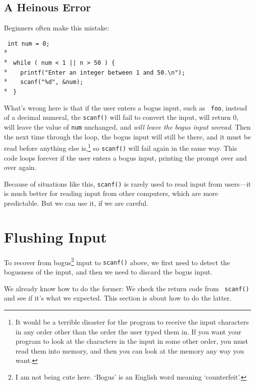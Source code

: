 \subsection{A Heinous Error}

Beginners often make this mistake:
\label{heinous-error}

\begin{flushleft}
\verb! int num = 0; ! \\*
\verb!  ! \\*
\verb! while ( num < 1 || n > 50 ) { ! \\*
\verb!   printf("Enter an integer between 1 and 50.\n"); ! \\*
\verb!   scanf("%d", &num); ! \\*
\verb! } ! 
\end{flushleft}

What's wrong here is that if the user enters a bogus input, such as {\tt
foo}, instead of a decimal numeral, the {\tt scanf()} will fail to
convert the input, will return 0, will leave the value of {\tt num}
unchanged, and {\em will leave the bogus input unread}\/.  Then the next
time through the loop, the bogus input will still be there, and it must
be read before anything else is,\footnote{It would be a terrible
disaster for the program to receive the input characters in any order
other than the order the user typed them in.  If you want your program
to look at the characters in the input in some other order, you must
read them into memory, and then you can look at the memory any way you
want.} so {\tt scanf()} will fail again in the same way.  This code
loops forever if the user enters a bogus input, printing the prompt over
and over again.

Because of situations like this, {\tt scanf()} is rarely used to read
input from users---it is much better for reading input from other
computers, which are more predictable.  But we can use it, if we are
careful.

\section{Flushing Input}

To recover from bogus\footnote{I am not being cute here.  `Bogus' is an
English word meaning `counterfeit'.} input to {\tt scanf()} above, we
first need to detect the bogusness of the input, and then we need to
discard the bogus input.

We already know how to do the former: We check the return code from {\tt
scanf()} and see if it's what we expected.  This section is about how to
do the latter.

